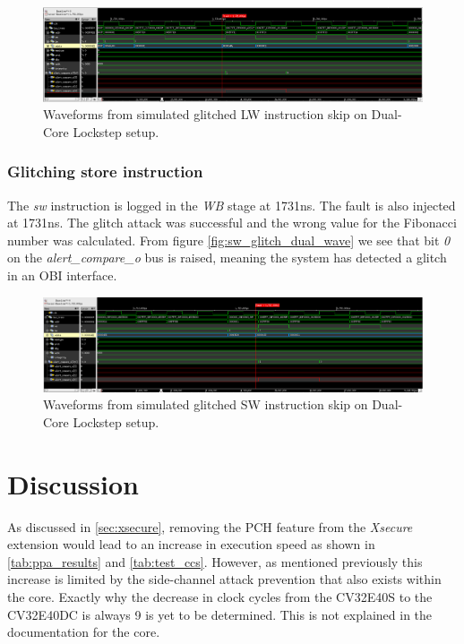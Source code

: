 \begin{figure}[h!]
    \centering
    \includegraphics[width=\textwidth]{docs/images/lw_glitch_dual_core.png}
    \caption{Waveforms from simulated glitched LW instruction skip on Dual-Core Lockstep setup.}
    \label{fig:lw_glitch_dual_wave}
\end{figure}

\subsubsection{Glitching store instruction}

The \textit{sw} instruction is logged in the \textit{WB} stage at 1731ns. The fault is also injected at 1731ns. The glitch attack was successful and the wrong value for the Fibonacci number was calculated. From figure \autoref{fig:sw_glitch_dual_wave} we see that bit \textit{0} on the \textit{alert\_compare\_o} bus is raised, meaning the system has detected a glitch in an OBI interface. 

\begin{figure}[h!]
    \centering
    \includegraphics[width=\textwidth]{docs/images/sw_glitch_dual_core.png}
    \caption{Waveforms from simulated glitched SW instruction skip on Dual-Core Lockstep setup.}
    \label{fig:sw_glitch_dual_wave}
\end{figure}

\section{Discussion}
\label{sec:discussion}

As discussed in \autoref{sec:xsecure}, removing the PCH feature from the \textit{Xsecure} extension would lead to an increase in execution speed as shown in \autoref{tab:ppa_results} and \autoref{tab:test_ccs}. However, as mentioned previously this increase is limited by the side-channel attack prevention that also exists within the core. Exactly why the decrease in clock cycles from the CV32E40S to the CV32E40DC is always 9 is yet to be determined. This is not explained in the documentation for the core.  

